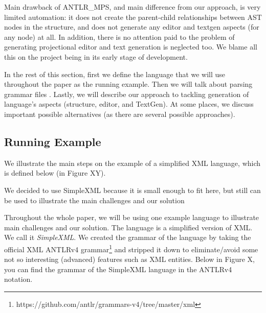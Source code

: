 Main drawback of ANTLR{\_}MPS, and main difference from our approach, is very limited automation: it does not create the parent-child relationships between AST nodes in the structure, and does not generate any editor and textgen aspects (for any node) at all.
In addition, there is no attention paid to the problem of generating projectional editor and text generation is neglected too.
We blame all this on the project being in its early stage of development.

In the rest of this section, first we define the language that we will use throughout the paper as the running example.
Then we will talk about parsing grammar files .
Lastly, we will describe our approach to tackling generation of language's aspects (structure, editor, and TextGen).
At some places, we discuss important possible alternatives (as there are several possible approaches).

\subsection{Running Example}

We illustrate the main steps on the example of a simplified XML language, which is defined below (in Figure XY).


We decided to use SimpleXML because it is small enough to fit here, but still can be used to illustrate the main challenges and our solution

Throughout the whole paper, we will be using one example language to illustrate main challenges and our solution.
The language is a simplified version of XML. We call it \emph{SimpleXML}.
We created the grammar of the language by taking the official XML ANTLRv4 grammar\footnote{https://github.com/antlr/grammars-v4/tree/master/xml} and stripped it down to eliminate/avoid some not so interesting (advanced) features such as XML entities.
Below in Figure X, you can find the grammar of the SimpleXML language in the ANTLRv4 notation.

